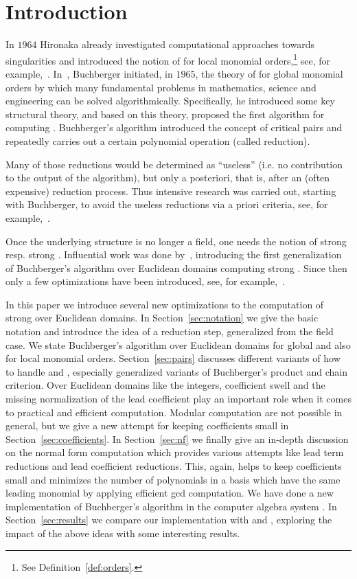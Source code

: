 \section{Introduction}
\label{sec:intro} In $1964$ Hironaka already investigated
computational approaches towards singularities and introduced the notion of
\stbs for local monomial orders,\footnote{See Definition~\ref{def:orders}.} see, for
example,~\cite{hironaka11964, hironaka21964, grauert1972}.
In~\cite{bGroebner1965, bGroebner1965eng}, Buchberger initiated, in $1965$, the theory
of \gbs for global monomial orders by which many fundamental problems in mathematics, science
and engineering can be solved algorithmically. Specifically, he introduced some key
structural theory, and based on
this theory, proposed the first algorithm for computing \gbs.
Buchberger's algorithm introduced the concept of critical pairs and repeatedly carries out a certain
polynomial operation (called reduction).

Many of those reductions would be
determined as ``useless'' (i.e. no contribution to the output of the algorithm),
but only a posteriori, that is, after an (often expensive) reduction process.
Thus intensive research was carried out, starting with Buchberger, to avoid the
useless reductions via a priori criteria, see,  for
example,~\cite{bGroebnerCriterion1979,buchberger2ndCriterion1985,gmInstallation1988}.

Once the underlying structure is no longer a field, one needs
the notion of strong \gbs resp. strong \stbs. Influential work was done
by~\cite{kapur1988}, introducing the first generalization of Buchberger's
algorithm over Euclidean domains computing strong \gbs. Since then only a few
optimizations have been introduced, see, for example,~\cite{Wienand2011,
    lichtblau2012, eppSigZ2017}.

In this paper we introduce several new optimizations to the computation of
strong \stbs over Euclidean domains. In Section~\ref{sec:notation} we give the
basic notation and introduce the idea of a reduction step, generalized from the
field case. We state
Buchberger's algorithm over Euclidean domains for global and also for local
monomial orders. Section~\ref{sec:pairs} discusses different variants of how to
handle \spts and \gpts, especially generalized variants of Buchberger's product
and chain criterion. Over Euclidean domains like the integers, coefficient swell
and the missing normalization of the lead coefficient play an important role when it
comes to practical and efficient computation. Modular computation are not
possible in general, but we give a new attempt for keeping coefficients small
in Section~\ref{sec:coefficients}. In Section~\ref{sec:nf} we finally give an
in-depth discussion on the normal form computation which provides various attempts
like lead term reductions and lead coefficient reductions. This, again, helps to keep coefficients small and
minimizes the number of polynomials in a basis which have the same
leading monomial by applying efficient gcd computation.
We have done a new implementation of Buchberger's algorithm in the computer
algebra system \singular. In Section~\ref{sec:results} we compare our implementation
with \macaulay and \magma, exploring the impact of the above ideas with
some interesting results.
